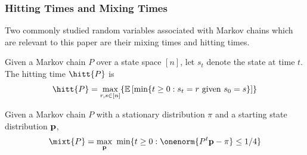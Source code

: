 \subsubsection{Hitting Times and Mixing Times}
Two commonly studied random variables associated with Markov chains which are relevant to this paper are their mixing times and hitting times. 
\begin{definition}
	Given a Markov chain $P$ over a state space $[n]$, let $s_t$ denote the state at time $t$. The hitting time $\hitt{P}$ is 
	\begin{align*}
	\hitt{P} = \max_{r,s \in [n]} \{\E\left[\min \{t \ge 0 : s_t = r \text{ given } s_0 = s\}\right] \}
	\end{align*}
\end{definition}

\begin{definition}
	Given a Markov chain $P$ with a stationary distribution $\pi$ and a starting state distribution $\mathbf{p}$, 
	\begin{align*}
	\mixt{P} = \max_{\vect{p}}~\min \{t \ge 0 : \onenorm{ P^t \vect{p} - \pi} \le 1/4 \}
	\end{align*}
\end{definition}




